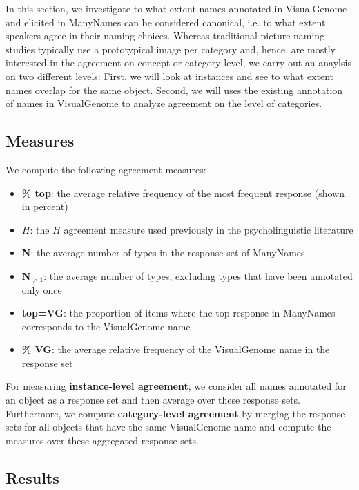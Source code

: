 In this section, we investigate to what extent names annotated in VisualGenome and elicited in ManyNames can be considered canonical, i.e. to what extent speakers agree in their naming choices.
Whereas traditional picture naming studies typically use a prototypical image per category and, hence, are mostly interested in the agreement on concept or category-level, we carry out an anaylsis on two different levels: First, we will look at instances and see to what extent names overlap for the same object. Second, we will uses the existing annotation of names in VisualGenome to analyze agreement on the level of categories.


\subsection{Measures}

We compute the following agreement measures:

\begin{itemize}
\item \textbf{\% top}: the average relative frequency of the most frequent response (shown in percent)
\item \textbf{$H$}: the $H$ agreement measure used previously in the psycholinguistic literature
\item \textbf{N}: the average number of types in the response set of ManyNames
\item \textbf{N$_{>1}$}: the average number of types, excluding types that have been annotated only once
\item \textbf{top=VG}: the proportion of items where the top response in ManyNames corresponds to the VisualGenome name
\item \textbf{\% VG}: the average relative frequency of the VisualGenome name in the response set

\end{itemize}

For measuring \textbf{instance-level agreement}, we consider all names annotated for an object as a response set and then average over these response sets. Furthermore, we compute \textbf{category-level agreement} by merging the response sets for all objects that have the same VisualGenome name and compute the measures over these aggregated response sets.

\subsection{Results}

